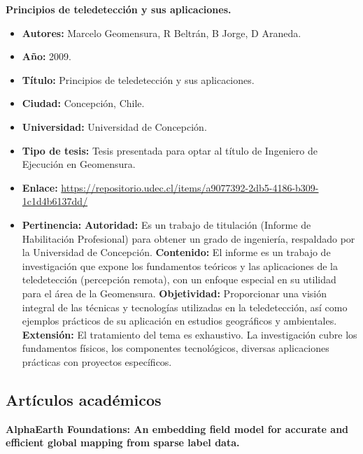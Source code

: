 \textbf{Principios de teledetección y sus aplicaciones. \cite{En2009}}
\begin{itemize}
  \item \textbf{Autores:} Marcelo Geomensura, R Beltrán, B Jorge, D Araneda.
  \item \textbf{Año:} 2009.
  \item \textbf{Título:} Principios de teledetección y sus aplicaciones.
  \item \textbf{Ciudad:} Concepción, Chile.
  \item \textbf{Universidad:} Universidad de Concepción.
  \item \textbf{Tipo de tesis:} Tesis presentada para optar al título de Ingeniero de Ejecución en Geomensura.
  \item \textbf{Enlace:} \url{https://repositorio.udec.cl/items/a9077392-2db5-4186-b309-1c1d4b6137dd/}
  \item \textbf{Pertinencia:}
  \subitem \textbf{Autoridad:} Es un trabajo de titulación (Informe de Habilitación Profesional) para obtener un grado de ingeniería, respaldado por la Universidad de Concepción.
  \subitem \textbf{Contenido:} El informe es un trabajo de investigación que expone los fundamentos teóricos y las aplicaciones de la teledetección (percepción remota), con un enfoque especial en su utilidad para el área de la Geomensura.
  \subitem \textbf{Objetividad:} Proporcionar una visión integral de las técnicas y tecnologías utilizadas en la teledetección, así como ejemplos prácticos de su aplicación en estudios geográficos y ambientales.
  \subitem \textbf{Extensión:} El tratamiento del tema es exhaustivo. La investigación cubre los fundamentos físicos, los componentes tecnológicos, diversas aplicaciones prácticas con proyectos específicos.
\end{itemize}

\subsection{Artículos académicos}

\textbf{AlphaEarth Foundations: An embedding field
model for accurate and efficient global
mapping from sparse label data. \cite{Brown2025}}

